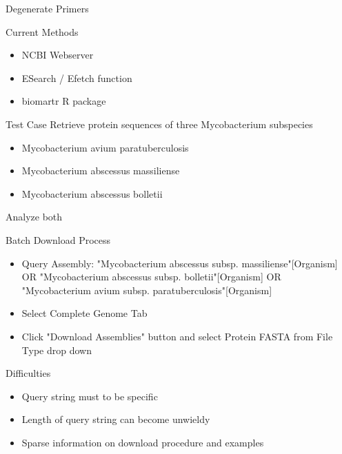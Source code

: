 \documentclass[11pt]{beamer}
\begin{document}
	\begin{frame}{Degenerate Primers}
	\begin{block}{Current Methods}
	\begin{itemize}
	\item NCBI Webserver
	\item ESearch / Efetch function
	\item biomartr R package
	\end{itemize}
	\end{block}
	
	\begin{block}{Test Case}
	Retrieve protein sequences of three Mycobacterium subspecies \\ 
	\begin{itemize}
	\item Mycobacterium avium paratuberculosis
	\item Mycobacterium abscessus massiliense
	\item Mycobacterium abscessus bolletii
	\end{itemize}
	\end{block}
	
	\end{frame}
	
	\begin{frame}{Analyze both}
	\begin{block}{Batch Download Process}
	\begin{itemize}
	\item Query Assembly: "Mycobacterium abscessus \alert{subsp.} massiliense"[Organism] OR "Mycobacterium abscessus \alert{subsp.} bolletii"[Organism] OR "Mycobacterium avium \alert{subsp.} paratuberculosis"[Organism] 
	\item Select Complete Genome Tab
	\item Click "Download Assemblies" button and select Protein FASTA from File Type drop down 
	\end{itemize}
	\end{block}
	\begin{block}{Difficulties}
	\begin{itemize}
	\item Query string must to be specific
	\item Length of query string can become unwieldy
	\item Sparse information on download procedure and examples
	\end{itemize}
	\end{block}
	\end{frame}
	
\end{document}
